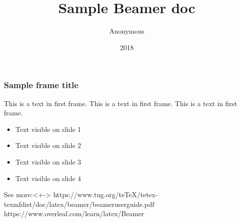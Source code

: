 \documentclass{beamer}
\title{Sample Beamer doc}
\author{Anonymous}
\institute{BME}
\date{2018}
\begin{document}
 
\frame{\titlepage}
 
\begin{frame}
\frametitle{Sample frame title}
This is a text in first frame. This is a text in first frame. This is a text in first frame.

\begin{itemize}
 \item<1-> Text visible on slide 1
 \item<2-> Text visible on slide 2
\end{itemize}

\begin{itemize}[<+-| alert@+>]
 \item Text visible on slide 3
 \item Text visible on slide 4
\end{itemize}

\begin{block}{See more:}<+->
\scriptsize
https://www.tug.org/teTeX/tetex-texmfdist/doc/latex/beamer/beameruserguide.pdf\\
https://www.overleaf.com/learn/latex/Beamer
\end{block}

\end{frame}
 
\end{document}
